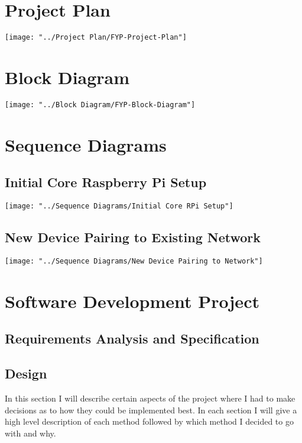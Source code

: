 \newpage
\section{Project Plan}
\begin{center}
	\texttt{[image: "../Project Plan/FYP-Project-Plan"]}
\end{center}

\newpage
\section{Block Diagram}
\begin{center}
	\texttt{[image: "../Block Diagram/FYP-Block-Diagram"]}
\end{center}

\newpage
\section{Sequence Diagrams}
\subsection{Initial Core Raspberry Pi Setup}
\begin{center}
	\texttt{[image: "../Sequence Diagrams/Initial Core RPi Setup"]}
\end{center}

\newpage
\subsection{New Device Pairing to Existing Network}
\begin{center}
	\texttt{[image: "../Sequence Diagrams/New Device Pairing to Network"]}
\end{center}

\newpage
\section{Software Development Project}

\subsection{Requirements Analysis and Specification}

\subsection{Design}
In this section I will describe certain aspects of the project where I had to make decisions as to how they could be implemented best. In each section I will give a high level description of each method followed by which method I decided to go with and why.

